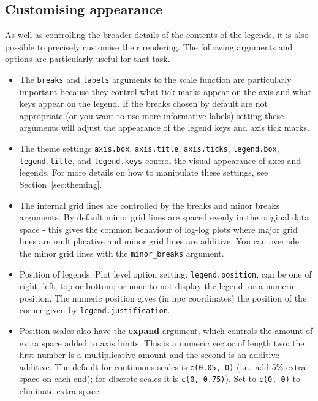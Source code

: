 \subsection{Customising appearance}

As well as controlling the broader details of the contents of the legends, it is also possible to precisely customise their rendering.  The following arguments and options are particularly useful for that task.

\begin{itemize}
  \item The {\tt breaks} and {\tt labels} arguments to the scale function are particularly important because they control what tick marks appear on the axis and what keys appear on the legend.  If the breaks chosen by default are not appropriate (or you want to use more informative labels) setting these arguments will adjust the appearance of the legend keys and axis tick marks.  
  
  \item The theme settings {\tt axis.box}, {\tt axis.title}, {\tt axis.ticks}, {\tt legend.box}, {\tt legend.title}, and {\tt legend.keys} control the visual appearance of axes and legends.  For more details on how to manipulate these settings, see Section~\ref{sec:theming}.

  \item The internal grid lines are controlled by the breaks and minor breaks arguments.  By default minor grid lines are spaced evenly in the original data space - this gives the common behaviour of log-log plots where major grid lines are multiplicative and minor grid lines are additive.  You can override the minor grid lines with the {\tt minor\_breaks} argument.
  
  \item Position of legends.  Plot level option setting: {\tt legend.position}, can be one of right, left, top or bottom; or none to not display the legend; or a numeric position.  The numeric position gives (in npc  coordinates) the position of the corner given by {\tt legend.justification}.  
  
  \item Position scales also have the {\bf expand} argument, which controls the amount of extra space added to axis limits.  This is a numeric vector of length two: the first number is a multiplicative amount and the second is an additive additive.  The default for continuous scales is {\tt c(0.05, 0)} (i.e.\ add 5\% extra space on each end); for discrete scales it is {\tt c(0, 0.75)}).  Set to {\tt c(0, 0)} to eliminate extra space.
  
\end{itemize}

